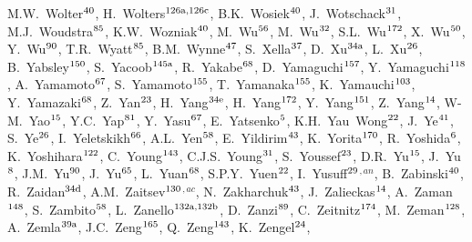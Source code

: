 \begin{flushleft}
M.W.~Wolter$^\textrm{\scriptsize 40}$,
H.~Wolters$^\textrm{\scriptsize 126a,126c}$,
B.K.~Wosiek$^\textrm{\scriptsize 40}$,
J.~Wotschack$^\textrm{\scriptsize 31}$,
M.J.~Woudstra$^\textrm{\scriptsize 85}$,
K.W.~Wozniak$^\textrm{\scriptsize 40}$,
M.~Wu$^\textrm{\scriptsize 56}$,
M.~Wu$^\textrm{\scriptsize 32}$,
S.L.~Wu$^\textrm{\scriptsize 172}$,
X.~Wu$^\textrm{\scriptsize 50}$,
Y.~Wu$^\textrm{\scriptsize 90}$,
T.R.~Wyatt$^\textrm{\scriptsize 85}$,
B.M.~Wynne$^\textrm{\scriptsize 47}$,
S.~Xella$^\textrm{\scriptsize 37}$,
D.~Xu$^\textrm{\scriptsize 34a}$,
L.~Xu$^\textrm{\scriptsize 26}$,
B.~Yabsley$^\textrm{\scriptsize 150}$,
S.~Yacoob$^\textrm{\scriptsize 145a}$,
R.~Yakabe$^\textrm{\scriptsize 68}$,
D.~Yamaguchi$^\textrm{\scriptsize 157}$,
Y.~Yamaguchi$^\textrm{\scriptsize 118}$,
A.~Yamamoto$^\textrm{\scriptsize 67}$,
S.~Yamamoto$^\textrm{\scriptsize 155}$,
T.~Yamanaka$^\textrm{\scriptsize 155}$,
K.~Yamauchi$^\textrm{\scriptsize 103}$,
Y.~Yamazaki$^\textrm{\scriptsize 68}$,
Z.~Yan$^\textrm{\scriptsize 23}$,
H.~Yang$^\textrm{\scriptsize 34e}$,
H.~Yang$^\textrm{\scriptsize 172}$,
Y.~Yang$^\textrm{\scriptsize 151}$,
Z.~Yang$^\textrm{\scriptsize 14}$,
W-M.~Yao$^\textrm{\scriptsize 15}$,
Y.C.~Yap$^\textrm{\scriptsize 81}$,
Y.~Yasu$^\textrm{\scriptsize 67}$,
E.~Yatsenko$^\textrm{\scriptsize 5}$,
K.H.~Yau~Wong$^\textrm{\scriptsize 22}$,
J.~Ye$^\textrm{\scriptsize 41}$,
S.~Ye$^\textrm{\scriptsize 26}$,
I.~Yeletskikh$^\textrm{\scriptsize 66}$,
A.L.~Yen$^\textrm{\scriptsize 58}$,
E.~Yildirim$^\textrm{\scriptsize 43}$,
K.~Yorita$^\textrm{\scriptsize 170}$,
R.~Yoshida$^\textrm{\scriptsize 6}$,
K.~Yoshihara$^\textrm{\scriptsize 122}$,
C.~Young$^\textrm{\scriptsize 143}$,
C.J.S.~Young$^\textrm{\scriptsize 31}$,
S.~Youssef$^\textrm{\scriptsize 23}$,
D.R.~Yu$^\textrm{\scriptsize 15}$,
J.~Yu$^\textrm{\scriptsize 8}$,
J.M.~Yu$^\textrm{\scriptsize 90}$,
J.~Yu$^\textrm{\scriptsize 65}$,
L.~Yuan$^\textrm{\scriptsize 68}$,
S.P.Y.~Yuen$^\textrm{\scriptsize 22}$,
I.~Yusuff$^\textrm{\scriptsize 29}$$^{,an}$,
B.~Zabinski$^\textrm{\scriptsize 40}$,
R.~Zaidan$^\textrm{\scriptsize 34d}$,
A.M.~Zaitsev$^\textrm{\scriptsize 130}$$^{,ac}$,
N.~Zakharchuk$^\textrm{\scriptsize 43}$,
J.~Zalieckas$^\textrm{\scriptsize 14}$,
A.~Zaman$^\textrm{\scriptsize 148}$,
S.~Zambito$^\textrm{\scriptsize 58}$,
L.~Zanello$^\textrm{\scriptsize 132a,132b}$,
D.~Zanzi$^\textrm{\scriptsize 89}$,
C.~Zeitnitz$^\textrm{\scriptsize 174}$,
M.~Zeman$^\textrm{\scriptsize 128}$,
A.~Zemla$^\textrm{\scriptsize 39a}$,
J.C.~Zeng$^\textrm{\scriptsize 165}$,
Q.~Zeng$^\textrm{\scriptsize 143}$,
K.~Zengel$^\textrm{\scriptsize 24}$,

\end{flushleft}
